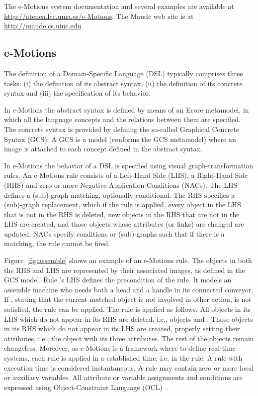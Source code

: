 The e-Motions system documentation and several examples are available at \url{http://atenea.lcc.uma.es/e-Motions}. The Maude web site is at \url{http://maude.cs.uiuc.edu}.

\subsection{e-Motions}\label{sub:emotions}

The definition of a Domain-Specific Language (DSL) typically comprises three tasks: (i) the definition of its abstract syntax, (ii) the definition of its concrete syntax and (iii) the specification of its behavior.

In e-Motions the abstract syntax is defined by means of an Ecore metamodel, in which all the language concepts and the relations between them are specified. The concrete syntax is provided by defining the so-called Graphical Concrete Syntax (GCS). A GCS is a model (conforms the GCS metamodel) where an image is attached to each concept defined in the abstract syntax.

In e-Motions the behavior of a DSL is specified using visual graph-transformation rules. An e-Motions rule consists of a Left-Hand Side (LHS), a Right-Hand Side (RHS) and zero or more Negative Application Conditions (NACs). The LHS defines a (sub)-graph matching, optionally conditional. The RHS specifies a (sub)-graph replacement, which if the rule is applied, every object in the LHS that is not in the RHS is deleted, new objects in the RHS that are not in the LHS are created, and those objects whose attributes (or links) are changed are updated. NACs specify conditions or (sub)-graphs such that if there is a matching, the rule cannot be fired.

Figure~\ref{fig:assemble} shows an example of an e-Motions rule. The objects in both the RHS and LHS are represented by their associated images, as defined in the GCS model. Rule 's LHS defines the precondition of the rule. It models an assemble machine who needs both a head and a handle in its connected conveyor. If , stating that the current matched  object is not involved in other  action, is not satisfied, the rule can be applied. The rule is applied as follows. All objects in its LHS which do not appear in its RHS are deleted, i.e., objects  and . Those objects in its RHS which do not appear in its LHS are created, properly setting their attributes, i.e., the  object with its three attributes. The rest of the objects remain changeless. Moreover, as e-Motions is a framework where to define real-time systems, each rule is applied in a established time, i.e.  in the  rule. A rule with execution time \code{[0,0]} is considered instantaneous. A rule may contain zero or more local or auxiliary variables. All attribute or variable assignments and conditions are expressed using Object-Constraint Language (OCL)~\cite{ocl}.

